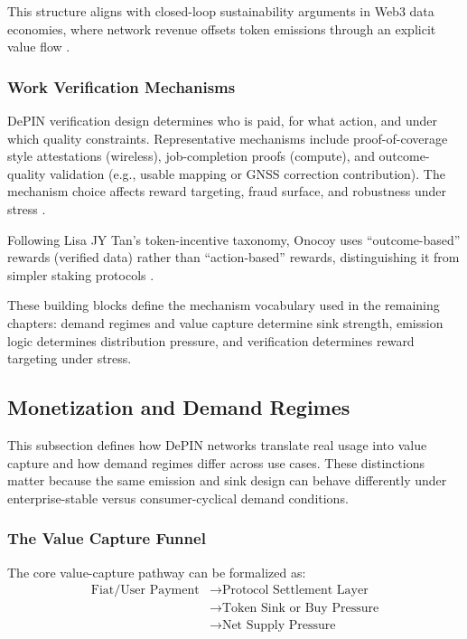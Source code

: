 This structure aligns with closed-loop sustainability arguments in Web3 data economies, where network revenue offsets token emissions through an explicit value flow \cite{McConaghy2020}.

\subsubsection{Work Verification Mechanisms}
DePIN verification design determines who is paid, for what action, and under which quality constraints. Representative mechanisms include proof-of-coverage style attestations (wireless), job-completion proofs (compute), and outcome-quality validation (e.g., usable mapping or GNSS correction contribution). The mechanism choice affects reward targeting, fraud surface, and robustness under stress \cite{Ballandies2023, Chiu2024}.

Following Lisa JY Tan's token-incentive taxonomy, Onocoy uses ``outcome-based'' rewards (verified data) rather than ``action-based'' rewards, distinguishing it from simpler staking protocols \cite{Tan2020}.

These building blocks define the mechanism vocabulary used in the remaining chapters: demand regimes and value capture determine sink strength, emission logic determines distribution pressure, and verification determines reward targeting under stress.

\subsection{Monetization and Demand Regimes}
\label{subsec:demand_regimes}
This subsection defines how DePIN networks translate real usage into value capture and how demand regimes differ across use cases. These distinctions matter because the same emission and sink design can behave differently under enterprise-stable versus consumer-cyclical demand conditions.

\subsubsection{The Value Capture Funnel}
The core value-capture pathway can be formalized as:
\[
\begin{aligned}
\text{Fiat/User Payment} &\rightarrow \text{Protocol Settlement Layer} \\
&\rightarrow \text{Token Sink or Buy Pressure} \\
&\rightarrow \text{Net Supply Pressure}
\end{aligned}
\]

